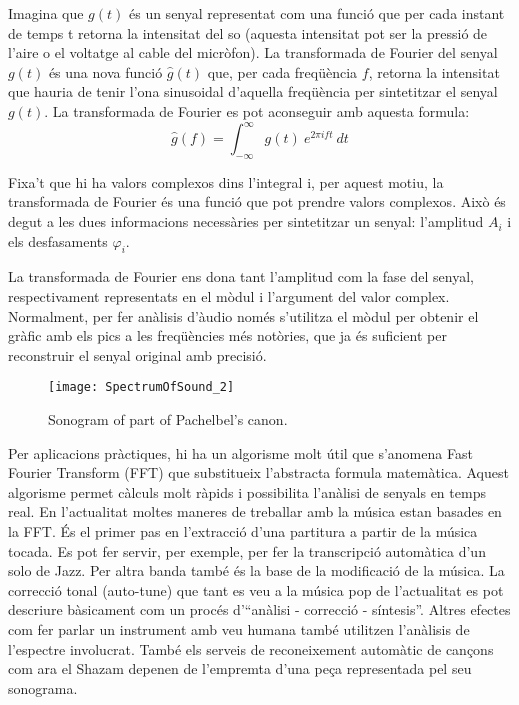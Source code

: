 Imagina que $g(t)$ és un senyal representat com una funció que per cada instant de temps t retorna la intensitat del so (aquesta intensitat pot ser la pressió de l'aire o el voltatge al cable del micròfon). La transformada de Fourier del senyal $g(t)$ és una nova funció $\hat g(t)$ que, per cada freqüència $f$, retorna la intensitat que hauria de tenir l'ona sinusoidal d'aquella freqüència per sintetitzar el senyal $g(t)$. La transformada de Fourier es pot aconseguir amb aquesta formula: 
$$\hat g(f) = \int_{-\infty}^{\infty} g(t)\ e^{2\pi i f t } \ dt$$

Fixa't que hi ha valors complexos dins l'integral i, per aquest motiu, la transformada de Fourier és una funció que pot prendre valors complexos. Això és degut a les dues informacions necessàries per sintetitzar un senyal: l'amplitud $A_i$ i els desfasaments $\varphi_i$. 

La transformada de Fourier ens dona tant l'amplitud com la fase del senyal, respectivament representats en el mòdul i l'argument del valor complex. Normalment, per fer anàlisis d'àudio només s'utilitza el mòdul per obtenir el gràfic amb els pics a les freqüències més notòries, que ja és suficient per reconstruir el senyal original amb precisió.

\begin{wrapfigure}{r}{0.45\textwidth}
\centering
\texttt{[image: SpectrumOfSound\_2]}
\caption*{Sonogram of part of Pachelbel's canon.}
\end{wrapfigure}

Per aplicacions pràctiques, hi ha un algorisme molt útil que s'anomena Fast Fourier Transform (FFT) que substitueix l'abstracta formula matemàtica. Aquest algorisme permet càlculs molt ràpids i possibilita l'anàlisi de senyals en temps real. En l'actualitat moltes maneres de treballar amb la música estan basades en la FFT. És el primer pas en l'extracció d'una partitura a partir de la música tocada. Es pot fer servir, per exemple, per fer la transcripció automàtica d'un solo de Jazz. Per altra banda també és la base de la modificació de la música. La correcció tonal (auto-tune) que tant es veu a la música pop de l'actualitat es pot descriure bàsicament com un procés d'``anàlisi - correcció - síntesis''. Altres efectes com fer parlar un instrument amb veu humana també utilitzen l'anàlisis de l'espectre involucrat. També els serveis de reconeixement automàtic de cançons com ara el Shazam depenen de l'empremta d'una peça representada pel seu sonograma.  

